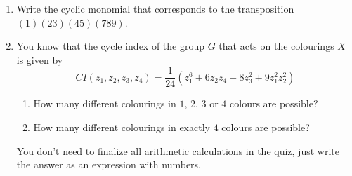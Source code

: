 \documentclass[12pt]{article}
\begin{document}
\begin{enumerate} 
    \item Write the cyclic monomial that corresponds to the transposition $(1)(23)(45)(789)$.
    
    \item You know that the cycle index of the group $G$ that acts on the colourings $X$ is given by 
    \[
    CI(z_1, z_2, z_3, z_4) = \frac{1}{24}(z_1^6 + 6z_2z_4 + 8z_3^2 + 9z_1^2 z_2^2)
    \]
    \begin{enumerate}[label=\alph*)]
        \item How many different colourings in $1$, $2$, $3$ or $4$ colours are possible?
        \item How many different colourings in exactly $4$ colours are possible?
    \end{enumerate}

    You don't need to finalize all arithmetic calculations in the quiz, just write the answer as an expression with numbers. 
\end{enumerate}
\end{document}
